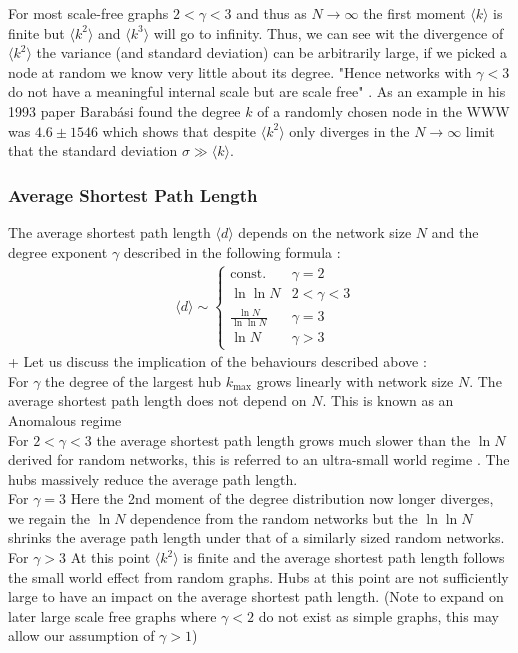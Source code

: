 \documentclass{article}
\begin{document}
                For most scale-free graphs $2<\gamma<3$ and thus as $N\to \infty$ the first moment $\langle k \rangle$ is finite but $\langle k^2 \rangle$ and $\langle k^3 \rangle$ will go to infinity. Thus, we can see wit the divergence of $\langle k^2 \rangle$ the variance (and standard deviation) can be arbitrarily large, if we picked a node at random we know very little about its degree. "Hence networks with $\gamma<3$ do not have a meaningful internal scale but are scale free" \parencite{barabasi2013network}. As an example in his 1993 paper Barabási found the degree $k$ of a randomly chosen node in the WWW was $4.6 \pm 1546$ which shows that despite $\langle k^2 \rangle$ only diverges in the $N \to \infty$ limit that the standard deviation $\sigma \gg  \langle k \rangle$.\\
            \subsubsection{Average Shortest Path Length}
            The average shortest path length $\langle d \rangle$ depends on the network size $N$ and the degree exponent $\gamma$ described in the following formula \parencite{bollobas2004diameter}\parencite{cohen2003scale}:\\
            \begin{align*}
                &\langle d \rangle \sim
                \begin{cases}
                    \text{const.} &\gamma =2\\
                    \ln\ln N  &2<\gamma<3\\
                    \frac{\ln N}{\ln\ln N}  &\gamma = 3\\
                    \ln N  &\gamma>3
                \end{cases}
            \end{align*}+
            Let us discuss the implication of the behaviours described above \parencite{barabasi2013network}:\\
            For $\gamma$ the degree of the largest hub $k_{\text{max}}$ grows linearly with network size $N$. The average shortest path length does not depend on $N$. This is known as an Anomalous regime\\
            For $2<\gamma<3$ the average shortest path length grows much slower than the $\ln N$ derived for random networks, this is referred to an ultra-small world regime \parencite{cohen2003scale}. The hubs massively reduce the average path length.\\
            For $\gamma =3$ Here the 2nd moment of the degree distribution now longer diverges, we regain the $\ln N$ dependence from the random networks but the $\ln\ln N$ shrinks the average path length under that of a similarly sized random networks.\\
            For $\gamma > 3$ At this point $\langle k^2 \rangle$ is finite and the average shortest path length follows the small world effect from random graphs. Hubs at this point are not sufficiently large to have an impact on the average shortest path length.
            (Note to expand on later large scale free graphs where $\gamma < 2$ do not exist as simple graphs, this may allow our assumption of $\gamma >1$)
\end{document}
